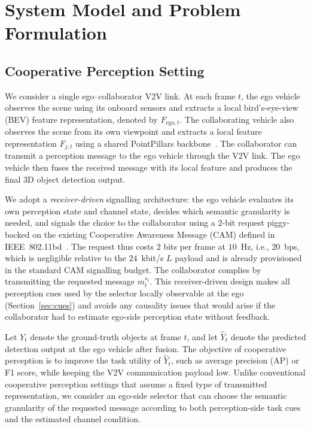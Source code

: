\documentclass[journal]{IEEEtran}
\begin{document}
\section{System Model and Problem Formulation}\label{sec:system}

\subsection{Cooperative Perception Setting}

We consider a single ego--collaborator V2V link. At each frame $t$, the ego vehicle observes the scene using its onboard sensors and extracts a local bird's-eye-view (BEV) feature representation, denoted by $F_{\mathrm{ego},t}$. The collaborating vehicle also observes the scene from its own viewpoint and extracts a local feature representation $F_{j,t}$ using a shared PointPillars backbone~\cite{lang2019pointpillars}. The collaborator can transmit a perception message to the ego vehicle through the V2V link. The ego vehicle then fuses the received message with its local feature and produces the final 3D object detection output.

We adopt a \emph{receiver-driven} signalling architecture: the ego vehicle evaluates its own perception state and channel state, decides which semantic granularity is needed, and signals the choice to the collaborator using a $2$-bit request piggy-backed on the existing Cooperative Awareness Message (CAM) defined in IEEE~802.11bd~\cite{ieee80211bd}. The request thus costs $2$ bits per frame at $10$~Hz, i.e., $20$~bps, which is negligible relative to the $24$~kbit/s $L$ payload and is already provisioned in the standard CAM signalling budget. The collaborator complies by transmitting the requested message $m_t^{s_t}$. This receiver-driven design makes all perception cues used by the selector locally observable at the ego (Section~\ref{sec:cues}) and avoids any causality issues that would arise if the collaborator had to estimate ego-side perception state without feedback.

Let $Y_t$ denote the ground-truth objects at frame $t$, and let $\hat{Y}_t$ denote the predicted detection output at the ego vehicle after fusion. The objective of cooperative perception is to improve the task utility of $\hat{Y}_t$, such as average precision (AP) or F1 score, while keeping the V2V communication payload low. Unlike conventional cooperative perception settings that assume a fixed type of transmitted representation, we consider an ego-side selector that can choose the semantic granularity of the requested message according to both perception-side task cues and the estimated channel condition.
\end{document}
